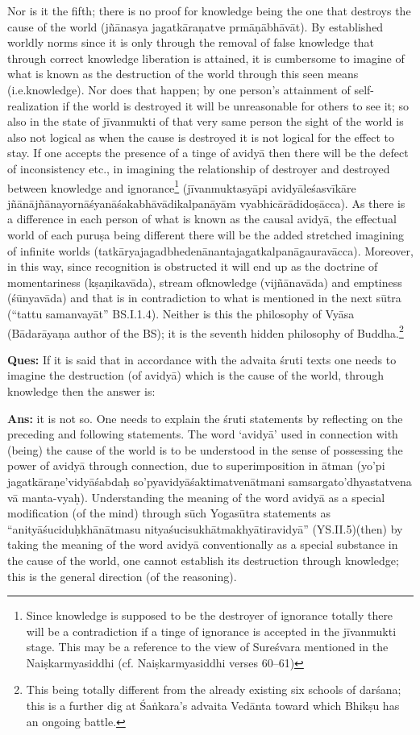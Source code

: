 Nor is it the fifth; there is no proof for knowledge being the one that destroys the cause of the world (jñānasya jagatkāraṇatve prmāṇābhāvāt). By established worldly norms since it is only through the removal of false knowledge that through correct knowledge liberation is attained, it is cumbersome to imagine of what is known as the destruction of the world through this seen means (i.e.knowledge). Nor does that happen; by one person’s attainment of self-realization if the world is destroyed it will be unreasonable for others to see it; so also in the state of jīvanmukti of that very same person the sight of the world is also not logical as when the cause is destroyed it is not logical for the effect to stay. If one accepts the presence of a tinge of avidyā then there will be the defect of inconsistency etc., in imagining the relationship of destroyer and destroyed between knowledge and ignorance\footnote{Since knowledge is supposed to be the destroyer of ignorance totally there will be a contradiction if a tinge of ignorance is accepted in the jīvanmukti stage. This may be a reference to the view of Sureśvara mentioned in the Naiṣkarmyasiddhi (cf. Naiṣkarmyasiddhi verses 60--61)} (jīvanmuktasyāpi avidyāleśasvīkāre jñānājñānayornāśyanāśakabhāvā\-dikalpanāyām vyabhicārādidoṣācca). As there is a difference in each person of what is known as the causal avidyā, the effectual world of each puruṣa being different there will be the added stretched imagining of infinite worlds (tatkāryajagadbhedenānantajagatkalpanāgaura\-vācca). Moreover, in this way, since recognition is obstructed it will end up as the doctrine of momentariness (kṣaṇikavāda), stream of\break knowledge (vijñānavāda) and emptiness (śūnyavāda) and that is in contradiction to what is mentioned in the next sūtra (“tattu samanvayāt” BS.I.1.4). Neither is this the philosophy of Vyāsa (Bādarāyaṇa author of the BS); it is the seventh hidden philosophy of Buddha.\footnote{This being totally different from the already existing six schools of darśana; this is a further dig at Śaṅkara’s advaita Vedānta toward which Bhikṣu has an ongoing battle.}

\textbf{Ques:} If it is said that in accordance with the advaita śruti texts one needs to imagine the destruction (of avidyā) which is the cause of the world, through knowledge then the answer is:

\textbf{Ans:} it is not so. One needs to explain the śruti statements by reflecting on the preceding and following statements. The word ‘avidyā’ used in connection with (being) the cause of the world is to be understood in the sense of possessing the power of avidyā through connection, due to superimposition in ātman (yo’pi jagatkāraṇe’vidyāśabdaḥ so’pyavidyāśaktimatvenātmani samsargato’dhyastatvena vā manta-\break\-vyaḥ). Understanding the meaning of the word avidyā as a special modification (of the mind) through sūch Yogasūtra statements as “anityāśuciduḥkhānātmasu nityaśucisukhātmakhyātiravidyā” (YS.II.5)\break (then) by taking the meaning of the word avidyā conventionally as a special substance in the cause of the world, one cannot establish its destruction through knowledge; this is the general direction (of the reasoning).

